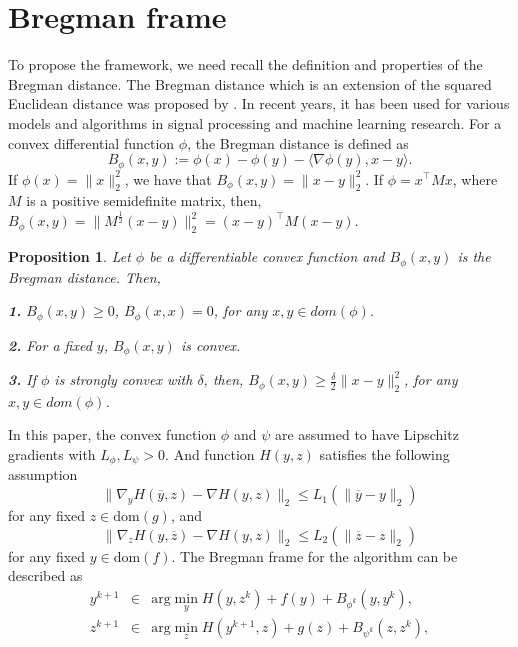 \documentclass[12pt]{article}
\newtheorem{proposition}{Proposition}
\begin{document}
\section{Bregman frame}
To propose the framework, we need recall the definition and properties of the Bregman distance.
The Bregman distance which is an extension of the squared Euclidean distance was proposed by \cite{bregman1967relaxation}. In recent years, it has been used for various models and algorithms in signal processing and machine learning research\cite{eckstein2014understanding,yin2010analysis,yin2008bregman}.  For a convex differential function $\phi$, the Bregman distance is defined as
\begin{equation}
    B_{\phi}(x,y):=\phi(x)-\phi(y)-\langle\nabla\phi(y),x-y\rangle.
\end{equation}
If $\phi(x)=\|x\|_2^2$, we have that $B_{\phi}(x,y)=\|x-y\|_2^2$. If $\phi=x^{\top}Mx$, where $M$ is a positive semidefinite matrix, then, $B_{\phi}(x,y)=\|M^{\frac{1}{2}}(x-y)\|_2^2=(x-y)^{\top}M(x-y)$.
\begin{proposition}
Let $\phi$ be a differentiable convex function and $B_{\phi}(x,y)$ is the Bregman distance. Then,

\textbf{1.} $B_{\phi}(x,y)\geq 0$, $B_{\phi}(x,x)=0$, for any $x,y\in dom(\phi)$.

\textbf{2.} For a fixed $y$, $B_{\phi}(x,y)$ is convex.

\textbf{3.} If $\phi$ is strongly convex with $\delta$, then, $B_{\phi}(x,y)\geq \frac{\delta}{2}\|x-y\|_2^2$, for any $x,y\in dom(\phi)$.
\end{proposition}
In this paper, the convex function $\phi$ and $\psi$ are assumed to have   Lipschitz  gradients with $L_{\phi},L_{\psi}>0$. And function $H(y,z)$ satisfies the following assumption
\begin{equation}
    \|\nabla_y H(\overline{y},z)-\nabla H(y,z)\|_2\leq L_1(\|\overline{y}-y\|_2)
\end{equation}
for any fixed $z\in  \textrm{dom}(g)$, and
\begin{equation}
    \|\nabla_z H(y,\overline{z})-\nabla H(y,z)\|_2\leq L_2(\|\overline{z}-z\|_2)
\end{equation}
for any fixed $y\in  \textrm{dom}(f)$.
The Bregman frame for the algorithm can be described as
\begin{eqnarray}\label{scheme}
y^{k+1}&\in& \textrm{arg}\min_{y} H(y,z^k)+f(y)+B_{\phi^k}(y,y^k),\nonumber\\
z^{k+1}&\in& \textrm{arg}\min_{z} H(y^{k+1},z)+g(z)+B_{\psi^k}(z,z^k),\nonumber
\end{eqnarray}
\end{document}
